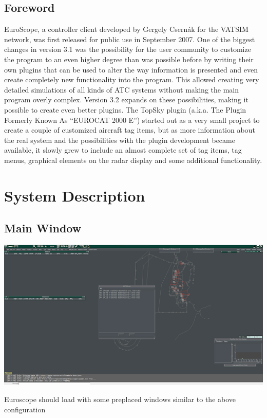 \documentclass[11pt,a4paper,oldfontcommands]{memoir}
\begin{document}
\section{Foreword}
EuroScope, a controller client developed by Gergely Csernák for the VATSIM network, was first released for public use in September 2007. One of the biggest changes in version 3.1 was the possibility for the user community to customize the program to an even higher degree than was possible before by writing their own plugins that can be used to alter the way information is presented and even create completely new functionality into the program. This allowed creating very detailed simulations of all kinds of ATC systems without making the main program overly complex. Version 3.2 expands on these possibilities, making it possible to create even better plugins.
The TopSky plugin (a.k.a. The Plugin Formerly Known As “EUROCAT 2000 E”) started out as a very small project to create a couple of customized aircraft tag items, but as more information about the real system and the possibilities with the plugin development became available, it slowly grew to include an almost complete set of tag items, tag menus, graphical elements on the radar display and some additional functionality.

\chapter{System Description}
\section{Main Window}
\includegraphics[width=15cm, keepaspectratio]{img/mainwindow.png}

Euroscope should load with some preplaced windows similar to the above configuration
\end{document}
